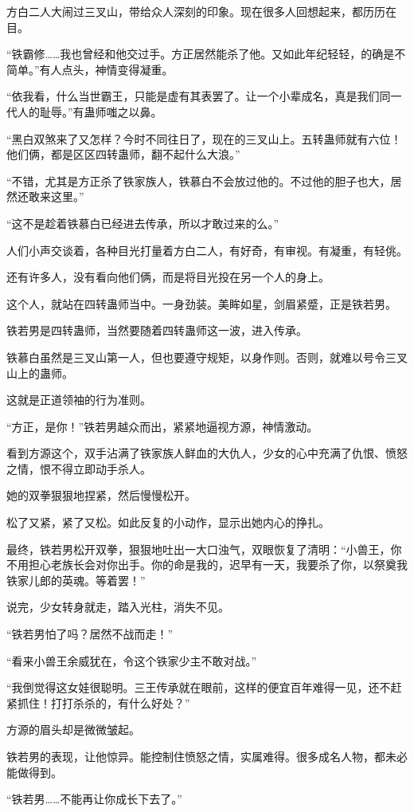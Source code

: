 \begin{this_body}
方白二人大闹过三叉山，带给众人深刻的印象。现在很多人回想起来，都历历在目。

“铁霸修……我也曾经和他交过手。方正居然能杀了他。又如此年纪轻轻，的确是不简单。”有人点头，神情变得凝重。

“依我看，什么当世霸王，只能是虚有其表罢了。让一个小辈成名，真是我们同一代人的耻辱。”有蛊师嗤之以鼻。

“黑白双煞来了又怎样？今时不同往日了，现在的三叉山上。五转蛊师就有六位！他们俩，都是区区四转蛊师，翻不起什么大浪。”

“不错，尤其是方正杀了铁家族人，铁慕白不会放过他的。不过他的胆子也大，居然还敢来这里。”

“这不是趁着铁慕白已经进去传承，所以才敢过来的么。”

人们小声交谈着，各种目光打量着方白二人，有好奇，有审视。有凝重，有轻佻。

还有许多人，没有看向他们俩，而是将目光投在另一个人的身上。

这个人，就站在四转蛊师当中。一身劲装。美眸如星，剑眉紧蹙，正是铁若男。

铁若男是四转蛊师，当然要随着四转蛊师这一波，进入传承。

铁慕白虽然是三叉山第一人，但也要遵守规矩，以身作则。否则，就难以号令三叉山上的蛊师。

这就是正道领袖的行为准则。

“方正，是你！”铁若男越众而出，紧紧地逼视方源，神情激动。

看到方源这个，双手沾满了铁家族人鲜血的大仇人，少女的心中充满了仇恨、愤怒之情，恨不得立即动手杀人。

她的双拳狠狠地捏紧，然后慢慢松开。

松了又紧，紧了又松。如此反复的小动作，显示出她内心的挣扎。

最终，铁若男松开双拳，狠狠地吐出一大口浊气，双眼恢复了清明：“小兽王，你不用担心老族长会对你出手。你的命是我的，迟早有一天，我要杀了你，以祭奠我铁家儿郎的英魂。等着罢！”

说完，少女转身就走，踏入光柱，消失不见。

“铁若男怕了吗？居然不战而走！”

“看来小兽王余威犹在，令这个铁家少主不敢对战。”

“我倒觉得这女娃很聪明。三王传承就在眼前，这样的便宜百年难得一见，还不赶紧抓住！打打杀杀的，有什么好处？”

方源的眉头却是微微皱起。

铁若男的表现，让他惊异。能控制住愤怒之情，实属难得。很多成名人物，都未必能做得到。

“铁若男……不能再让你成长下去了。”


\end{this_body}
